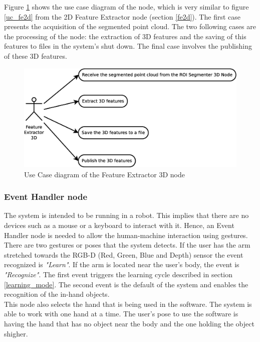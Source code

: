 	Figure \ref{uc_fe3d} shows the use case diagram of the node, which is very similar to figure \ref{uc_fe2d} from the 2D Feature Extractor node (section \ref{fe2d}). 
	The first case presents the acquisition of the segmented point cloud. 
	The two following cases are the processing of the node: the extraction of 3D features and the saving of this features to files in the system's shut down. 
	The final case involves the publishing of these 3D features. 

	\begin{figure}[H]
		\centering
			\includegraphics[scale=0.4]{img/diagrams/uc_feature_extractor_3d.eps}
			\caption[Use case diagram Feature Extractor 3D node]{Use Case diagram of the Feature Extractor 3D node}
		\label{uc_fe3d}
	\end{figure}


\subsubsection{Event Handler node}
\label{event_handler}
	The system is intended to be running in a robot. 
	This implies that there are no devices such as a mouse or a keyboard to interact with it. 
	Hence, an Event Handler node is needed to allow the human-machine interaction using gestures. 
	There are two gestures or poses that the system detects. 
	If the user has the arm stretched towards the RGB-D (Red, Green, Blue and Depth) sensor the event recognized is \textit{"Learn"}. 
	If the arm is located near the user's body, the event is \textit{"Recognize"}. 
	The first event triggers the learning cycle described in section \ref{learning_mode}. 
	The second event is the default of the system and enables the recognition of the in-hand objects. 
	\\

	This node also selects the hand that is being used in the software. 
	The system is able to work with one hand at a time. 
	The user's pose to use the software is having the hand that has no object near the body and the one holding the object shigher. 
	\\


